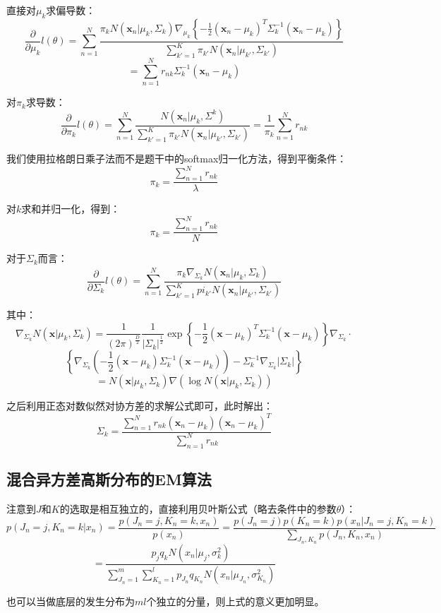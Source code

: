 \documentclass[UTF8]{ctexart}
\begin{document}
直接对$\mu_{k}$求偏导数：
$$\frac{\partial}{\partial \mu_{k}}l(\theta) = \sum_{n=1}^{N}\frac{\pi_{k}N(\textbf{x}_{n}|\mu_{k},\Sigma_{k})\nabla_{\mu_{k}}\left\{-\frac{1}{2}(\textbf{x}_{n}-\mu_{k})^{T}\Sigma_{k}^{-1}(\textbf{x}_{n}-\mu_{k})  \right\}}{\sum_{k'=1}^{K}\pi_{k'}N(\textbf{x}_{n}|\mu_{k'},\Sigma_{k'})}$$
$$=\sum_{n=1}^{N}r_{nk}\Sigma_{k}^{-1}(\textbf{x}_{n}-\mu_{k})$$

对$\pi_{k}$求导数：
$$\frac{\partial}{\partial \pi_{k}}l(\theta)=\sum_{n=1}^{N}\frac{N(\textbf{x}_{n}|\mu_{k},\Sigma^{k})}{\sum_{k'=1}^{K}\pi_{k'}N(\textbf{x}_{n}|\mu_{k'},\Sigma_{k'})}=\frac{1}{\pi_{k}}\sum_{n=1}^{N}r_{nk}$$

我们使用拉格朗日乘子法而不是题干中的softmax归一化方法，得到平衡条件：
$$\pi_{k}=\frac{\sum_{n=1}^{N}r_{nk}}{\lambda}$$

对$k$求和并归一化，得到：
$$\pi_{k}=\frac{\sum_{n=1}^{N}r_{nk}}{N}$$

对于$\Sigma_{k}$而言：
$$\frac{\partial}{\partial \Sigma_{k}}l(\theta)=\sum_{n=1}^{N}\frac{\pi_{k}\nabla_{\Sigma_{k}}N(\textbf{x}_{n}|\mu_{k},\Sigma_{k})}{\sum_{k'=1}^{K}pi_{k'}N(\textbf{x}_{n}|\mu_{k'},\Sigma_{k'})}$$

其中：
$$\nabla_{\Sigma_{k}}N(\textbf{x}|\mu_{k},\Sigma_{k})=\frac{1}{(2\pi)^{\frac{D}{2}}}\frac{1}{|\Sigma_{k}|^{\frac{1}{2}}}\exp\left\{ -\frac{1}{2}(\textbf{x}-\mu_{k})^{T}\Sigma_{k}^{-1}(\textbf{x}-\mu_{k}) \right\}\nabla_{\Sigma_{k}}\cdot$$
$$\left\{ \nabla_{\Sigma_{k}}(-\frac{1}{2}(\textbf{x}-\mu_{k})\Sigma_{k}^{-1}(\textbf{x}-\mu_{k}))-\Sigma_{k}^{-1}\nabla_{\Sigma_{k}}|\Sigma_{k}| \right\}$$
$$=N(\textbf{x}|\mu_{k},\Sigma_{k})\nabla(\log N(\textbf{x}|\mu_{k},\Sigma_{k}))$$

之后利用正态对数似然对协方差的求解公式即可，此时解出：
$$\Sigma_{k}=\frac{\sum_{n=1}^{N}r_{nk}(\textbf{x}_{n}-\mu_{k})(\textbf{x}_{n}-\mu_{k})^{T}}{\sum_{n=1}^{N}r_{nk}}$$

\subsection{混合异方差高斯分布的EM算法}
注意到$J$和$K$的选取是相互独立的，直接利用贝叶斯公式（略去条件中的参数$\theta$）：
$$p(J_{n}=j,K_{n}=k|x_{n})=\frac{p(J_{n}=j,K_{n}=k,x_{n})}{p(x_{n})}=\frac{p(J_{n}=j)p(K_{n}=k)p(x_{n}|J_{n}=j,K_{n}=k)}{\sum_{J_{n},K_{n}}p(J_{n},K_{n},x_{n})}$$
$$=\frac{p_{j}q_{k}N(x_{n}|\mu_{j},\sigma^{2}_{k})}{\sum_{J_{n}=1}^{m}\sum_{K_{n}=1}^{l}p_{J_{n}}q_{K_{n}}N(x_{n}|\mu_{J_{n}},\sigma^{2}_{K_{n}})}$$

也可以当做底层的发生分布为$ml$个独立的分量，则上式的意义更加明显。
\end{document}
